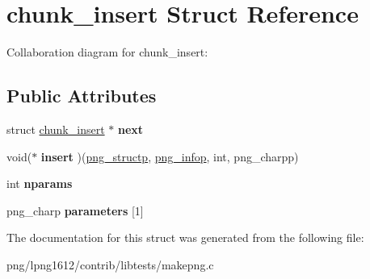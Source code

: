 \hypertarget{structchunk__insert}{\section{chunk\+\_\+insert Struct Reference}
\label{structchunk__insert}
}


Collaboration diagram for chunk\+\_\+insert\+:
\subsection*{Public Attributes}
\begin{DoxyCompactItemize}
\item 
\hypertarget{structchunk__insert_a0c61362dea9cf414f0f890cc09587e42}{struct \hyperlink{structchunk__insert}{chunk\+\_\+insert} $\ast$ {\bfseries next}}\label{structchunk__insert_a0c61362dea9cf414f0f890cc09587e42}

\item 
\hypertarget{structchunk__insert_a90d0ead6520607d6400e3b3ca653e2e2}{void($\ast$ {\bfseries insert} )(\hyperlink{structpng__struct__def}{png\+\_\+structp}, \hyperlink{structpng__info__def}{png\+\_\+infop}, int, png\+\_\+charpp)}\label{structchunk__insert_a90d0ead6520607d6400e3b3ca653e2e2}

\item 
\hypertarget{structchunk__insert_a23b39a16b343cf081b15a87fa5625989}{int {\bfseries nparams}}\label{structchunk__insert_a23b39a16b343cf081b15a87fa5625989}

\item 
\hypertarget{structchunk__insert_a39a49cbb74a8033593019be54b01d4ca}{png\+\_\+charp {\bfseries parameters} \mbox{[}1\mbox{]}}\label{structchunk__insert_a39a49cbb74a8033593019be54b01d4ca}

\end{DoxyCompactItemize}


The documentation for this struct was generated from the following file\+:\begin{DoxyCompactItemize}
\item 
png/lpng1612/contrib/libtests/makepng.\+c\end{DoxyCompactItemize}
